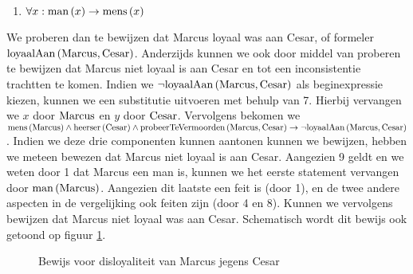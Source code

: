 \begin{leftbar}
\begin{enumerate}
 \item $\forall x:\mbox{man}\left( x \right)\rightarrow\mbox{mens}\left( x \right)$
\end{enumerate}
We proberen dan te bewijzen dat Marcus loyaal was aan Cesar, of formeler $\mbox{loyaalAan}\left( \mbox{Marcus},\mbox{Cesar} \right)$. Anderzijds kunnen we ook door middel van  proberen te bewijzen dat Marcus niet loyaal is aan Cesar en tot een inconsistentie trachtten te komen. Indien we $\neg\mbox{loyaalAan}\left( \mbox{Marcus},\mbox{Cesar} \right)$ als beginexpressie kiezen, kunnen we een substitutie uitvoeren met behulp van 7. Hierbij vervangen we $x$ door $\mbox{Marcus}$ en $y$ door $\mbox{Cesar}$. Vervolgens bekomen we $\mbox{mens}\left( \mbox{Marcus} \right)\wedge\mbox{heerser}\left( \mbox{Cesar} \right)\wedge\mbox{probeerTeVermoorden}\left( \mbox{Marcus},\mbox{Cesar} \right)\rightarrow\neg\mbox{loyaalAan}\left( \mbox{Marcus},\mbox{Cesar} \right)$. Indien we deze drie componenten kunnen aantonen kunnen we bewijzen, hebben we meteen bewezen dat Marcus niet loyaal is aan Cesar. Aangezien 9 geldt en we weten door 1 dat Marcus een man is, kunnen we het eerste statement vervangen door $\mbox{man}\left( \mbox{Marcus} \right)$. Aangezien dit laatste een feit is (door 1), en de twee andere aspecten in de vergelijking ook feiten zijn (door 4 en 8). Kunnen we vervolgens bewijzen dat Marcus niet loyaal was aan Cesar. Schematisch wordt dit bewijs ook getoond op figuur \ref{fig:proofMarcusCesar}.
\end{leftbar}
\begin{figure}[htb]
\centering
{}
\caption{Bewijs voor disloyaliteit van Marcus jegens Cesar}
\label{fig:proofMarcusCesar}
\end{figure}
